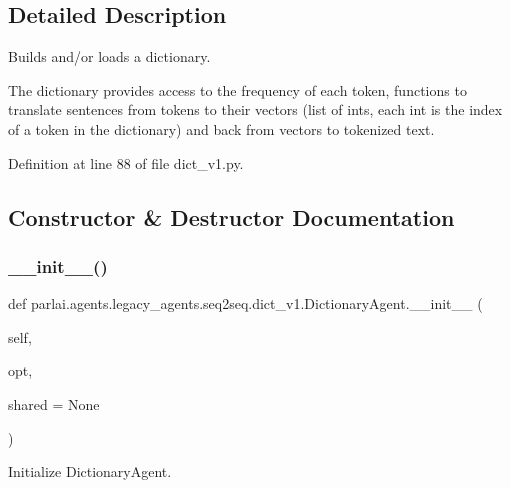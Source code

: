 \subsection{Detailed Description}
\begin{DoxyVerb}Builds and/or loads a dictionary.

The dictionary provides access to the frequency of each token, functions to
translate sentences from tokens to their vectors (list of ints, each int is the
index of a token in the dictionary) and back from vectors to tokenized text.
\end{DoxyVerb}
 

Definition at line 88 of file dict\+\_\+v1.\+py.



\subsection{Constructor \& Destructor Documentation}
\mbox{\label{classparlai_1_1agents_1_1legacy__agents_1_1seq2seq_1_1dict__v1_1_1DictionaryAgent_ae3eb915e40f2b8dc1788d2fa9d59697c}} 
\subsubsection{\texorpdfstring{\+\_\+\+\_\+init\+\_\+\+\_\+()}{\_\_init\_\_()}}
{\footnotesize\ttfamily def parlai.\+agents.\+legacy\+\_\+agents.\+seq2seq.\+dict\+\_\+v1.\+Dictionary\+Agent.\+\_\+\+\_\+init\+\_\+\+\_\+ (\begin{DoxyParamCaption}\item[{}]{self,  }\item[{}]{opt,  }\item[{}]{shared = {\ttfamily None} }\end{DoxyParamCaption})}

\begin{DoxyVerb}Initialize DictionaryAgent.
\end{DoxyVerb}
 

